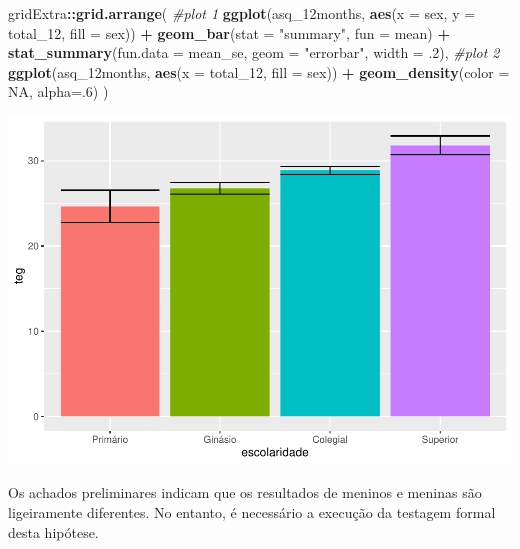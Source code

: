 \documentclass[
]{book}
\newenvironment{Shaded}{\begin{snugshade}}{\end{snugshade}}
\newcommand{\CommentTok}[1]{\textcolor[rgb]{0.56,0.35,0.01}{\textit{#1}}}
\newcommand{\DataTypeTok}[1]{\textcolor[rgb]{0.13,0.29,0.53}{#1}}
\newcommand{\DecValTok}[1]{\textcolor[rgb]{0.00,0.00,0.81}{#1}}
\newcommand{\FloatTok}[1]{\textcolor[rgb]{0.00,0.00,0.81}{#1}}
\newcommand{\KeywordTok}[1]{\textcolor[rgb]{0.13,0.29,0.53}{\textbf{#1}}}
\newcommand{\NormalTok}[1]{#1}
\newcommand{\OperatorTok}[1]{\textcolor[rgb]{0.81,0.36,0.00}{\textbf{#1}}}
\newcommand{\OtherTok}[1]{\textcolor[rgb]{0.56,0.35,0.01}{#1}}
\newcommand{\StringTok}[1]{\textcolor[rgb]{0.31,0.60,0.02}{#1}}
\begin{document}
\begin{Shaded}
\begin{Highlighting}[]
\NormalTok{gridExtra}\OperatorTok{::}\KeywordTok{grid.arrange}\NormalTok{(}
  \CommentTok{#plot 1 }
  \KeywordTok{ggplot}\NormalTok{(asq_12months, }\KeywordTok{aes}\NormalTok{(}\DataTypeTok{x =}\NormalTok{ sex, }\DataTypeTok{y =}\NormalTok{ total_}\DecValTok{12}\NormalTok{, }\DataTypeTok{fill =}\NormalTok{ sex)) }\OperatorTok{+}
\StringTok{    }\KeywordTok{geom_bar}\NormalTok{(}\DataTypeTok{stat =} \StringTok{"summary"}\NormalTok{, }\DataTypeTok{fun =}\NormalTok{ mean) }\OperatorTok{+}
\StringTok{    }\KeywordTok{stat_summary}\NormalTok{(}\DataTypeTok{fun.data =}\NormalTok{ mean_se, }\DataTypeTok{geom =} \StringTok{"errorbar"}\NormalTok{, }\DataTypeTok{width =} \FloatTok{.2}\NormalTok{),}
  \CommentTok{#plot 2}
    \KeywordTok{ggplot}\NormalTok{(asq_12months, }\KeywordTok{aes}\NormalTok{(}\DataTypeTok{x =}\NormalTok{ total_}\DecValTok{12}\NormalTok{, }\DataTypeTok{fill =}\NormalTok{ sex)) }\OperatorTok{+}\StringTok{ }
\StringTok{    }\KeywordTok{geom_density}\NormalTok{(}\DataTypeTok{color =} \OtherTok{NA}\NormalTok{, }\DataTypeTok{alpha=}\NormalTok{.}\DecValTok{6}\NormalTok{)}
\NormalTok{)}
\end{Highlighting}
\end{Shaded}

\begin{center}\includegraphics{gitbook-demo_files/figure-latex/unnamed-chunk-52-1} \end{center}

Os achados preliminares indicam que os resultados de meninos e meninas são ligeiramente diferentes. No entanto, é necessário a execução da testagem formal desta hipótese.
\end{document}
